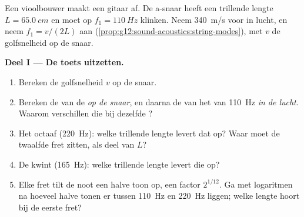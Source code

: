 \begin{problem}
\label{pb:g12:sound-acoustics:1}
Een vioolbouwer maakt een gitaar af. De a-snaar heeft een trillende lengte
$L = \qty{65.0}{cm}$ en moet op $f_1 = \qty{110}{Hz}$ klinken. Neem
\qty{340}{m/s} voor  in lucht, en neem $f_1 = v/(2L)$ aan
(\cref{prop:g12:sound-acoustics:string-modes}), met $v$ de golfsnelheid op
de snaar.

\medskip
\noindent\textbf{Deel I --- De toets uitzetten.}
\begin{enumerate}
  \item Bereken de golfsnelheid $v$ op de snaar.
  \item Bereken de  van de  \emph{op de snaar}, en
        daarna de  van het  van \qty{110}{Hz} \emph{in de
        lucht}. Waarom verschillen die bij dezelfde ?
  \item Het octaaf (\qty{220}{Hz}): welke trillende lengte levert dat op?
        Waar moet de twaalfde fret zitten, als deel van $L$?
  \item De kwint (\qty{165}{Hz}): welke trillende lengte levert die op?
  \item Elke fret tilt de noot een halve toon op, een factor $2^{1/12}$.
        Ga met logaritmen na hoeveel halve tonen er tussen \qty{110}{Hz}
        en \qty{220}{Hz} liggen; welke lengte hoort bij de eerste fret?
\end{enumerate}


\end{problem}
